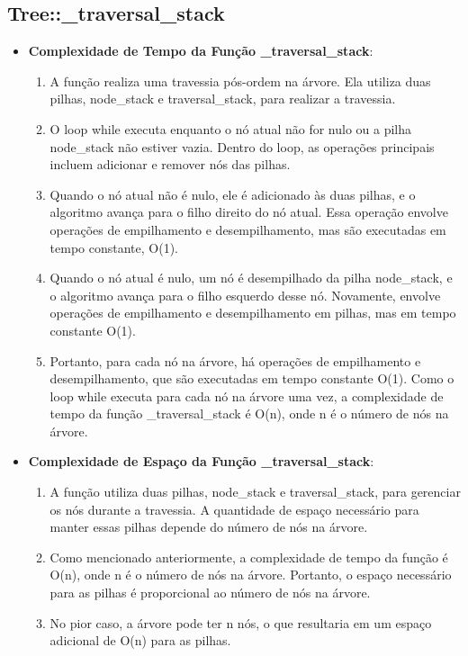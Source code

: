 \documentclass{article}
\begin{document}
\subsection{Tree::\_traversal\_stack}
\begin{itemize}
  \item \textbf{Complexidade de Tempo da Função \_traversal\_stack}:
    \begin{enumerate}
      \item A função realiza uma travessia pós-ordem na árvore. Ela utiliza duas pilhas, node\_stack e traversal\_stack, para realizar a travessia.
      \item O loop while executa enquanto o nó atual não for nulo ou a pilha node\_stack não estiver vazia. Dentro do loop, as operações principais incluem adicionar e remover nós das pilhas.
      \item Quando o nó atual não é nulo, ele é adicionado às duas pilhas, e o algoritmo avança para o filho direito do nó atual. Essa operação envolve operações de empilhamento e desempilhamento, mas são executadas em tempo constante, O(1).
      \item Quando o nó atual é nulo, um nó é desempilhado da pilha node\_stack, e o algoritmo avança para o filho esquerdo desse nó. Novamente, envolve operações de empilhamento e desempilhamento em pilhas, mas em tempo constante O(1).
      \item Portanto, para cada nó na árvore, há operações de empilhamento e desempilhamento, que são executadas em tempo constante O(1). Como o loop while executa para cada nó na árvore uma vez, a complexidade de tempo da função \_traversal\_stack é O(n), onde n é o número de nós na árvore. 
    \end{enumerate}
  \item \textbf{Complexidade de Espaço da Função \_traversal\_stack}:
    \begin{enumerate}
      \item A função utiliza duas pilhas, node\_stack e traversal\_stack, para gerenciar os nós durante a travessia. A quantidade de espaço necessário para manter essas pilhas depende do número de nós na árvore.
      \item Como mencionado anteriormente, a complexidade de tempo da função é O(n), onde n é o número de nós na árvore. Portanto, o espaço necessário para as pilhas é proporcional ao número de nós na árvore.
      \item No pior caso, a árvore pode ter n nós, o que resultaria em um espaço adicional de O(n) para as pilhas.

    \end{enumerate}
\end{itemize}
\end{document}
